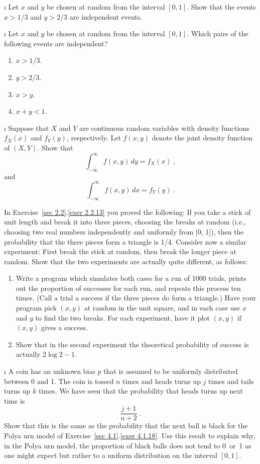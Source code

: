 \begin{LJSItem}
\i\label{exer 4.2.7} Let $x$ and $y$ be chosen at random from the interval $[0,1]$.  Show
that the events $x > 1/3$ and $y > 2/3$ are independent events.

\i\label{exer 4.2.8} Let $x$ and $y$ be chosen at random from the interval $[0,1]$.  Which
pairs of the following events are independent?
\begin{enumerate}
\item $x > 1/3$.

\item $y > 2/3$.

\item $x > y$.

\item $x + y < 1$.
\end{enumerate}

\i\label{exer 4.2.8.5}  Suppose that $X$ and $Y$ are continuous random variables with
density functions $f_X(x)$ and $f_Y(y)$, respectively.  Let $f(x, y)$ denote the joint
density function of $(X, Y)$.  Show that
$$
\int_{-\infty}^\infty f(x, y)\, dy = f_X(x)\ ,
$$ and
$$
\int_{-\infty}^\infty f(x, y)\, dx = f_Y(y)\ .
$$


\istar\label{exer 4.2.9} In Exercise~\ref{sec 2.2}.\ref{exer 2.2.13} you
proved the following: If you take a stick of unit length and break it into three pieces,
choosing the breaks at random (i.e., choosing two real numbers independently 
and uniformly from [0, 1]), then the probability that the three pieces form
a triangle is 1/4.  Consider now a similar experiment: First break the stick at
random, then break the longer piece at random.  Show that the two experiments
are actually quite different, as follows:
\begin{enumerate}
\item Write a program which simulates both cases for a run of 1000 trials,
prints out the proportion of successes for each run, and repeats this process
ten times.  (Call a trial a success if the three pieces do form a triangle.) 
Have your program pick $(x,y)$ at random in the unit square, and in each case
use $x$ and $y$ to find the two breaks.  For each experiment, have it plot
$(x,y)$ if $(x,y)$ gives a success.

\item Show that in the second experiment the theoretical probability of
success is actually $2\log 2 - 1$.
\end{enumerate}

\i\label{exer 4.2.10} A coin has an unknown bias $p$ that is assumed to be uniformly
distributed between 0 and 1.  The coin is tossed $n$ times and heads turns up
$j$ times and tails turns up $k$ times.  We have seen that the probability that
heads turns up next time is
$$
\frac {j + 1}{n + 2}\ .
$$
Show that this is the same as the probability that the next ball is black for
the Polya urn model of Exercise~\ref{sec 4.1}.\ref{exer 4.1.18}. 
Use this result to explain why, in the Polya urn model, the proportion of black
balls does not tend to 0~or~1 as one might expect but rather to a uniform
distribution on the interval $[0,1]$.


\end{LJSItem}
